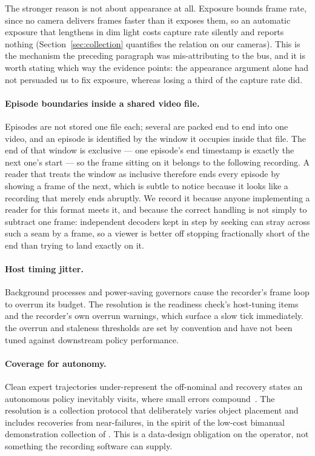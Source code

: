 The stronger reason is not about appearance at all. Exposure bounds frame rate,
since no camera delivers frames faster than it exposes them, so an automatic
exposure that lengthens in dim light costs capture rate silently and reports
nothing (Section~\ref{sec:collection} quantifies the relation on our cameras).
This is the mechanism the preceding paragraph was mis-attributing to the bus, and
it is worth stating which way the evidence points: the appearance argument alone
had not persuaded us to fix exposure, whereas losing a third of the capture rate
did.

\paragraph{Episode boundaries inside a shared video file.} Episodes are not
stored one file each; several are packed end to end into one video, and an
episode is identified by the window it occupies inside that file. The end of
that window is exclusive --- one episode's end timestamp is exactly the next
one's start --- so the frame sitting on it belongs to the following recording.
A reader that treats the window as inclusive therefore ends every episode by
showing a frame of the next, which is subtle to notice because it looks like a
recording that merely ends abruptly. We record it because anyone implementing a
reader for this format meets it, and because the correct handling is not simply
to subtract one frame: independent decoders kept in step by seeking can stray
across such a seam by a frame, so a viewer is better off stopping fractionally
short of the end than trying to land exactly on it.

\paragraph{Host timing jitter.} Background processes and power-saving
governors cause the recorder's frame loop to overrun its budget. The
resolution is the readiness check's host-tuning items and the recorder's
own overrun warnings, which surface a slow tick immediately. \unjustified{}
the overrun and staleness thresholds are set by convention and have not
been tuned against downstream policy performance.

\paragraph{Coverage for autonomy.} Clean expert trajectories
under-represent the off-nominal and recovery states an autonomous policy
inevitably visits, where small errors compound~\citep{ross2011dagger}. The
resolution is a collection protocol that deliberately varies object
placement and includes recoveries from near-failures, in the spirit of the
low-cost bimanual demonstration collection of \citet{zhao2023aloha}. This is a data-design obligation on the
operator, not something the recording software can supply.
